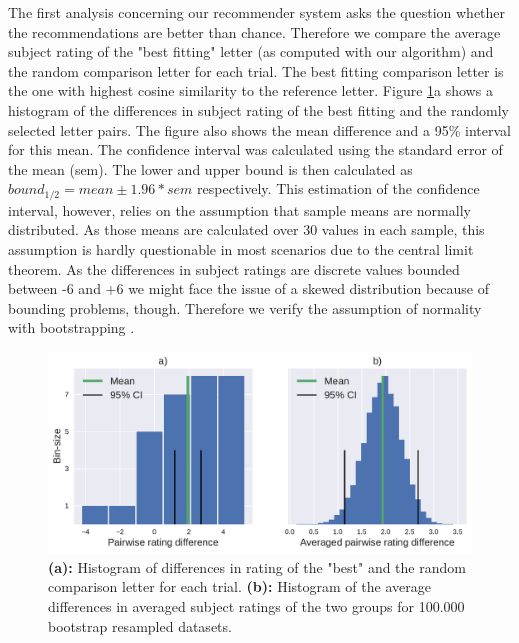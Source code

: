 The first analysis concerning our recommender system asks the question whether the recommendations are better than chance. Therefore we compare the average subject rating of the "best fitting" letter (as computed with our algorithm) and the random comparison letter for each trial. The best fitting comparison letter is the one with highest cosine similarity to the reference letter. %
Figure \ref{fig:both_diff_tf}a shows a histogram of the differences in subject rating of the best fitting and the randomly selected letter pairs. The figure also shows the mean difference and a 95\% interval for this mean. The confidence interval was calculated using the standard error of the mean (sem). The lower and upper bound is then calculated as $bound_{1/2} = mean \pm 1.96 * sem$ respectively. This estimation of the confidence interval, however, relies on the assumption that sample means are normally distributed. As those means are calculated over 30 values in each sample, this assumption is hardly questionable in most scenarios due to the central limit theorem. As the differences in subject ratings are discrete values bounded between -6 and +6 we might face the issue of a skewed distribution because of bounding problems, though. Therefore we verify the assumption of normality with bootstrapping \citep{Efron1979}.
\begin{figure}[h]
	\includegraphics[width=\textwidth]{figures/both_diff_tf}
	\caption{\textbf{(a):} Histogram of differences in rating of the "best" and the random comparison letter for each trial.
		\textbf{(b):} Histogram of the average differences in averaged subject ratings of the two groups for 100.000 bootstrap resampled datasets.}
	\label{fig:both_diff_tf}
\end{figure}
